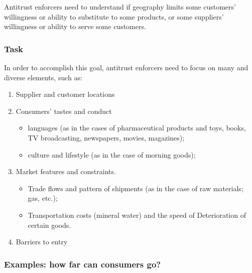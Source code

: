             Antitrust enforcers need to understand if geography limits some customers’ willingness or ability to substitute to some products, or some suppliers’ willingness or ability to serve some customers.

        \subsubsection{Task}

            In order to accomplish this goal, antitrust enforcers need to focus on many and diverse elements, such as:
            \begin{enumerate}
                \item Supplier and customer locations
                \item Consumers’ tastes and conduct
                    \begin{itemize}
                        \item languages (as in the cases of pharmaceutical products and toys, books, TV broadcasting, newspapers, movies, magazines);
                        \item culture and lifestyle (as in the case of morning goods);
                    \end{itemize}
                \item Market features and constraints.
                    \begin{itemize}
                        \item Trade flows and pattern of shipments (as in the case of raw materials; gas, etc.);
                        \item Transportation costs (mineral water) and the speed of Deterioration of certain goods.
                    \end{itemize}
                \item Barriers to entry
            \end{enumerate}

        \subsubsection{Examples: how far can consumers go?}

